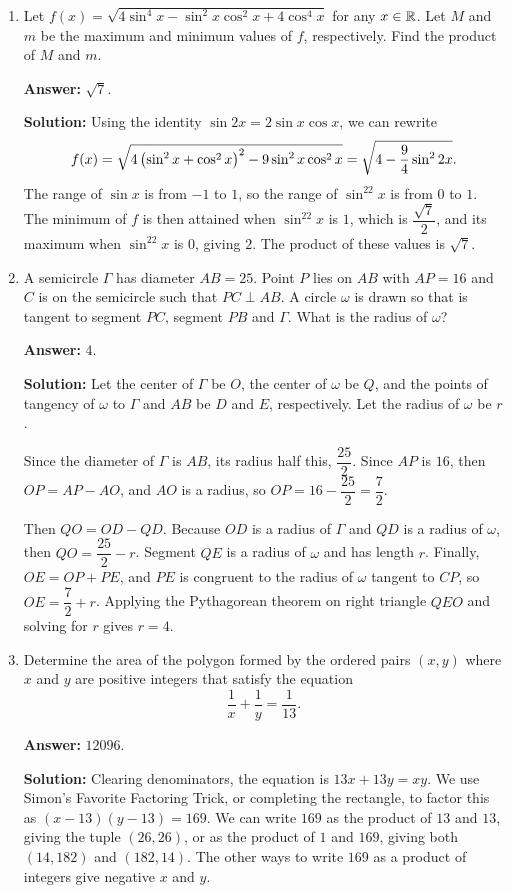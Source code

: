 \documentclass[11pt,paper=letter]{scrartcl}
\begin{document}
\begin{enumerate}[left=0pt]
\item Let $f(x) = \sqrt{4\sin^4x - \sin^2x\cos^2x + 4\cos^4x}$ for any $x \in \mathbb R$. Let $M$ and $m$ be the maximum and minimum values of $f$, respectively. Find the product of $M$ and $m$.

\textbf{Answer:} $\boxed{\sqrt{7}}$.

\textbf{Solution:} Using the identity $\sin2x = 2\sin x\cos x$, we can rewrite $$f(x) = \sqrt{4\left( \sin^2 x + \cos^2 x \right)^2 - 9\sin^2x\cos^2x} = \sqrt{4 - \dfrac94\sin^22x}.$$ The range of $\sin x$ is from $-1$ to $1$, so the range of $\sin^22x$ is from $0$ to $1$. The minimum of $f$ is then attained when $\sin^22x$ is $1$, which is $\dfrac{\sqrt7}2$, and its maximum when $\sin^22x$ is $0$, giving $2$. The product of these values is $\sqrt7$.

\item A semicircle $\Gamma$ has diameter $AB = 25$. Point $P$ lies on $AB$ with $AP = 16$ and $C$ is on the semicircle such that $PC \perp AB$. A circle $\omega$ is drawn so that is tangent to segment $PC$, segment $PB$ and $\Gamma$. What is the radius of $\omega$?

\textbf{Answer:} $\boxed{4}$.

\textbf{Solution:} Let the center of $\Gamma$ be $O$, the center of $\omega$ be $Q$, and the points of tangency of $\omega$ to $\Gamma$ and $AB$ be $D$ and $E$, respectively. Let the radius of $\omega$ be $r$.

Since the diameter of $\Gamma$ is $AB$, its radius half this, $\dfrac{25}2$. Since $AP$ is $16$, then $OP = AP - AO$, and $AO$ is a radius, so $OP = 16 - \dfrac{25}2 = \dfrac72$.

Then $QO = OD - QD$. Because $OD$ is a radius of $\Gamma$ and $QD$ is a radius of $\omega$, then $QO = \dfrac{25}2 - r$. Segment $QE$ is a radius of $\omega$ and has length $r$. Finally, $OE = OP + PE$, and $PE$ is congruent to the radius of $\omega$ tangent to $CP$, so $OE = \dfrac72 + r$. Applying the Pythagorean theorem on right triangle $QEO$ and solving for $r$ gives $r = 4$.

\item Determine the area of the polygon formed by the ordered pairs $(x, y)$ where $x$ and $y$ are positive integers that satisfy the equation $$\dfrac1x + \dfrac1y = \dfrac1{13}.$$

\textbf{Answer:} $\boxed{12096}$.

\textbf{Solution:} Clearing denominators, the equation is $13x + 13y = xy$. We use Simon's Favorite Factoring Trick, or completing the rectangle, to factor this as $(x-13)(y-13) = 169$. We can write $169$ as the product of $13$ and $13$, giving the tuple $(26, 26)$, or as the product of $1$ and $169$, giving both $(14, 182)$ and $(182, 14)$. The other ways to write $169$ as a product of integers give negative $x$ and $y$.


\end{enumerate}
\end{document}

